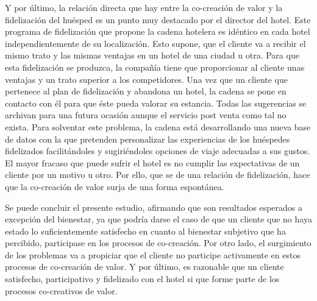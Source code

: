 Y por último, la relación directa que hay entre la co-creación de valor y la fidelización del huésped es un punto muy destacado por el director del hotel. Este programa de fidelización que propone la cadena hotelera es idéntico en cada hotel independientemente de su localización. Esto supone, que el cliente va a recibir el mismo trato y las mismas ventajas en un hotel de una ciudad u otra. Para que esta fidelización se produzca, la compañía tiene que proporcionar al cliente unas ventajas y un trato superior a los competidores. Una vez que un cliente que pertenece al plan de fidelización y abandona un hotel, la cadena se pone en contacto con él para que éste pueda valorar su estancia. Todas las sugerencias se archivan para una futura ocasión aunque el servicio post venta como tal no exista. Para solventar este problema, la cadena está desarrollando una nueva base de datos con la que pretenden personalizar las experiencias de los huéspedes fidelizados facilitándoles y sugiriéndoles opciones de viaje adecuadas a sus gustos. El mayor fracaso que puede sufrir el hotel es no cumplir las expectativas de un cliente por un motivo u otro. Por ello, que se de una relación de fidelización, hace que la co-creación de valor surja de una forma espontánea. 

Se puede concluir el presente estudio, afirmando que son resultados esperados a excepción del bienestar, ya que podría darse el caso de que un cliente que no haya estado lo suficientemente satisfecho en cuanto al bienestar subjetivo que ha percibido, participase en los procesos de co-creación. Por otro lado, el surgimiento de los problemas va a propiciar que el cliente no participe activamente en estos procesos de co-creación de valor. Y por último, es razonable que un cliente satisfecho, participativo y fidelizado con el hotel si que forme parte de los procesos co-creativos de valor.
